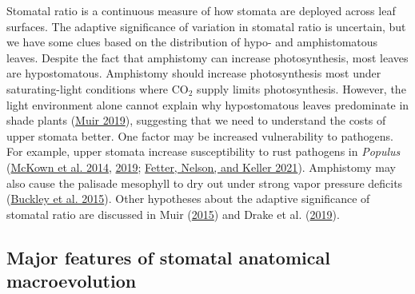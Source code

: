 \documentclass[
  12pt,
]{article}
\begin{document}
Stomatal ratio is a continuous measure of how stomata are deployed across leaf surfaces. The adaptive significance of variation in stomatal ratio is uncertain, but we have some clues based on the distribution of hypo- and amphistomatous leaves. Despite the fact that amphistomy can increase photosynthesis, most leaves are hypostomatous. Amphistomy should increase photosynthesis most under saturating-light conditions where CO\(_2\) supply limits photosynthesis. However, the light environment alone cannot explain why hypostomatous leaves predominate in shade plants (\protect\hyperlink{ref-muir_is_2019}{Muir 2019}), suggesting that we need to understand the costs of upper stomata better. One factor may be increased vulnerability to pathogens. For example, upper stomata increase susceptibility to rust pathogens in \emph{Populus} (\protect\hyperlink{ref-mckown_association_2014}{McKown et al. 2014}, \protect\hyperlink{ref-mckown_role_2019}{2019}; \protect\hyperlink{ref-fetter_growthdefense_2021}{Fetter, Nelson, and Keller 2021}). Amphistomy may also cause the palisade mesophyll to dry out under strong vapor pressure deficits (\protect\hyperlink{ref-buckley_how_2015}{Buckley et al. 2015}). Other hypotheses about the adaptive significance of stomatal ratio are discussed in Muir (\protect\hyperlink{ref-muir_making_2015}{2015}) and Drake et al. (\protect\hyperlink{ref-drake_two_2019}{2019}).

\hypertarget{major-features-of-stomatal-anatomical-macroevolution}{%
\subsection{Major features of stomatal anatomical macroevolution}\label{major-features-of-stomatal-anatomical-macroevolution}}
\end{document}
